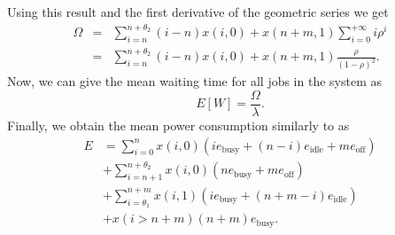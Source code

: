 Using this result and the first derivative of the geometric series we get 
\begin{eqnarray*}
\Omega &=& \sum_{i=n}^{n+\theta_2} (i-n)x(i,0) + x(n+m,1)\sum_{i=0}^{+\infty} i\rho^i\nonumber\\
&=& \sum_{i=n}^{n+\theta_2} (i-n)x(i,0) + x(n+m,1)\frac{\rho}{(1-\rho)^2}.
\end{eqnarray*}
Now, we can give the mean waiting time for all jobs in the system as
\begin{equation*}
E[W] = \frac{\Omega}{\lambda}.
\end{equation*}
Finally, we obtain the mean power consumption similarly to  as
\begin{align*}
E& = \sum_{i=0}^{n} x(i,0)(i e_\text{busy} + (n-i)e_\text{idle} + m e_\text{off})\\
&+ \sum_{i=n+1}^{n+\theta_2} x(i,0)(ne_\text{busy}+me_\text{off})\nonumber\\
&+\sum_{i=\theta_1}^{n+m} x(i,1)(i e_\text{busy} + (n+m-i)e_\text{idle})\nonumber\\
&+x(i > n+m)(n+m)e_\text{busy}.\nonumber
\end{align*}
